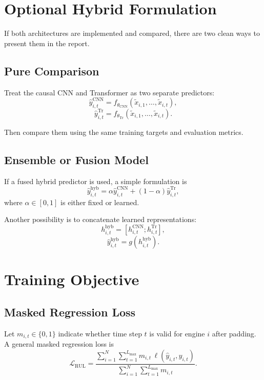 \documentclass[11pt,a4paper]{article}
\begin{document}
\section{Optional Hybrid Formulation}
If both architectures are implemented and compared, there are two clean ways to present them in the report.

\subsection{Pure Comparison}
Treat the causal CNN and Transformer as two separate predictors:
\begin{equation}
    \hat{y}_{i,t}^{\mathrm{CNN}} = f_{\theta_{\mathrm{CNN}}}(\tilde{x}_{i,1},\dots,\tilde{x}_{i,t}),
\end{equation}
\begin{equation}
    \hat{y}_{i,t}^{\mathrm{Tr}} = f_{\theta_{\mathrm{Tr}}}(\tilde{x}_{i,1},\dots,\tilde{x}_{i,t}).
\end{equation}

Then compare them using the same training targets and evaluation metrics.

\subsection{Ensemble or Fusion Model}
If a fused hybrid predictor is used, a simple formulation is
\begin{equation}
    \hat{y}_{i,t}^{\mathrm{hyb}} =
    \alpha \hat{y}_{i,t}^{\mathrm{CNN}}
    + (1-\alpha)\hat{y}_{i,t}^{\mathrm{Tr}},
\end{equation}
where $\alpha \in [0,1]$ is either fixed or learned.

Another possibility is to concatenate learned representations:
\begin{equation}
    h_{i,t}^{\mathrm{hyb}} =
    [h_{i,t}^{\mathrm{CNN}}; h_{i,t}^{\mathrm{Tr}}],
\end{equation}
\begin{equation}
    \hat{y}_{i,t}^{\mathrm{hyb}} = g(h_{i,t}^{\mathrm{hyb}}).
\end{equation}

\section{Training Objective}
\subsection{Masked Regression Loss}
Let $m_{i,t} \in \{0,1\}$ indicate whether time step $t$ is valid for engine $i$ after padding. A general masked regression loss is
\begin{equation}
    \mathcal{L}_{\mathrm{RUL}} =
    \frac{
        \sum_{i=1}^{N}\sum_{t=1}^{L_{\max}}
        m_{i,t}\,\ell(\hat{y}_{i,t}, y_{i,t})
    }{
        \sum_{i=1}^{N}\sum_{t=1}^{L_{\max}} m_{i,t}
    }.
\end{equation}
\end{document}
